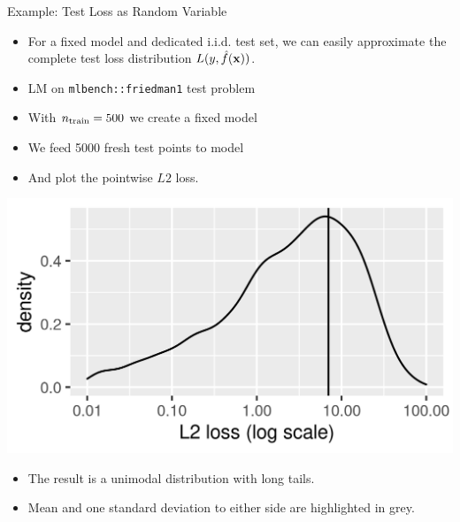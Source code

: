 \documentclass[11pt,compress,t,notes=noshow, xcolor=table]{beamer}
\begin{document}
\begin{vbframe}{Example: Test Loss as Random Variable}
\begin{itemize}
  \small
  \item For a fixed model and dedicated i.i.d. test set, we can easily approximate
      the complete test loss distribution $L(y, \hat{f}(\mathbf{x}))$.
  \item LM on \texttt{mlbench::friedman1} test problem
  \item With $n_{\mathrm{train}} = 500$ we create a fixed model
  \item We feed 5000 fresh test points to model
  \item And plot the pointwise $L2$ loss.
\end{itemize}

\vfill

\begin{minipage}[c]{0.5\textwidth}
  \includegraphics[width=\textwidth]{figure/fig_loss_distribution}
\end{minipage}
\begin{minipage}[c]{0.45\textwidth}
  \begin{itemize}
    \small
    \item The result is a unimodal 
    distribution with long tails.
    \item Mean and one standard deviation to either side are highlighted in 
    grey.
  \end{itemize}
\end{minipage}
\end{vbframe}
\end{document}
